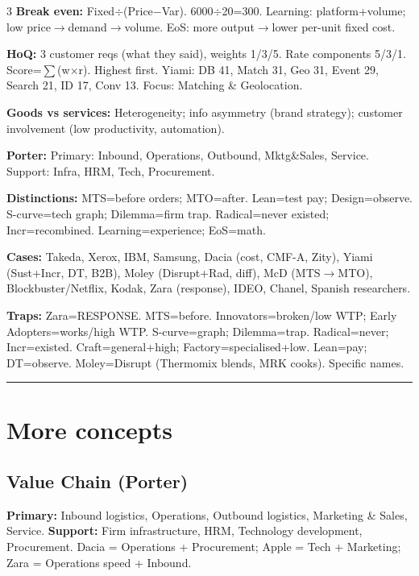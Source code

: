 \documentclass[8pt,a4paper]{article}
\begin{document}
\begin{multicols}{3}
\textbf{\color{eublue}Break even:} Fixed$\div$(Price$-$Var). 6000$\div$20=300. Learning: platform+volume; low price$\to$demand$\to$volume. EoS: more output$\to$lower per-unit fixed cost.

\textbf{\color{eublue}HoQ:} 3 customer reqs (what they said), weights 1/3/5. Rate components 5/3/1. Score=$\sum$(w$\times$r). Highest first. Yiami: DB 41, Match 31, Geo 31, Event 29, Search 21, ID 17, Conv 13. Focus: Matching \& Geolocation.

\textbf{\color{eublue}Goods vs services:} Heterogeneity; info asymmetry (brand strategy); customer involvement (low productivity, automation).

\textbf{\color{eublue}Porter:} Primary: Inbound, Operations, Outbound, Mktg\&Sales, Service. Support: Infra, HRM, Tech, Procurement.

\textbf{\color{eublue}Distinctions:} MTS=before orders; MTO=after. Lean=test pay; Design=observe. S-curve=tech graph; Dilemma=firm trap. Radical=never existed; Incr=recombined. Learning=experience; EoS=math.

\textbf{\color{eublue}Cases:} Takeda, Xerox, IBM, Samsung, Dacia (cost, CMF-A, Zity), Yiami (Sust+Incr, DT, B2B), Moley (Disrupt+Rad, diff), McD (MTS$\to$MTO), Blockbuster/Netflix, Kodak, Zara (response), IDEO, Chanel, Spanish researchers.

\textbf{\color{redtrap}Traps:} Zara=RESPONSE. MTS=before. Innovators=broken/low WTP; Early Adopters=works/high WTP. S-curve=graph; Dilemma=trap. Radical=never; Incr=existed. Craft=general+high; Factory=specialised+low. Lean=pay; DT=observe. Moley=Disrupt (Thermomix blends, MRK cooks). Specific names.
\end{multicols}
\vspace{0.3em}
\noindent\rule{\textwidth}{0.5pt}
\newpage
\pagestyle{plain}
\fontsize{10}{12}\selectfont

\section*{\color{eublue}More concepts}

\subsection*{Value Chain (Porter)}
\textbf{Primary:} Inbound logistics, Operations, Outbound logistics, Marketing \& Sales, Service. \textbf{Support:} Firm infrastructure, HRM, Technology development, Procurement. Dacia = Operations + Procurement; Apple = Tech + Marketing; Zara = Operations speed + Inbound.
\end{document}
